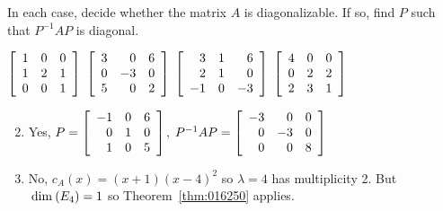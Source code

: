 \begin{multicols}{2}
\begin{ex}
\begin{sol}
\begin{enumerate}[label={\alph*.}]
\end{enumerate}
\end{sol}
\end{ex}

\begin{ex}
In each case, decide whether the matrix $A$ is diagonalizable. If so, find $P$ such that $P^{-1}AP$ is diagonal.

\begin{exenumerate}
\exitem $\left[ \begin{array}{rrr}
1 & 0 & 0 \\
1 & 2 & 1 \\
0 & 0 & 1
\end{array} \right]$
\exitem $\left[ \begin{array}{rrr}
3 &  0 & 6 \\
0 & -3 & 0 \\
5 &  0 & 2
\end{array} \right]$
\exitem $\left[ \begin{array}{rrr}
 3 &  1 &  6 \\
 2 &  1 &  0 \\
-1 &  0 & -3 
\end{array} \right]$
\exitem $\left[ \begin{array}{rrr}
4 & 0 & 0 \\
0 & 2 & 2 \\
2 & 3 & 1
\end{array} \right]$
\end{exenumerate}
\begin{sol}
\begin{enumerate}[label={\alph*.}]
\setcounter{enumi}{1}
\item  Yes, $ P =
\left[ \begin{array}{rrr}
-1 & 0 & 6 \\
 0 & 1 & 0 \\
 1 & 0 & 5
\end{array} \right]$, $P^{-1}AP = 
\left[ \begin{array}{rrr}
-3 &  0 & 0 \\
 0 & -3 & 0 \\
 0 &  0 & 8
\end{array} \right]$

\setcounter{enumi}{3}
\item  No, $c_{A}(x) = (x + 1)(x - 4)^{2}$ so $\lambda = 4$ has multiplicity 2. But $\thinspace\operatorname{dim\medspace}(E_{4}) = 1$ so Theorem~\ref{thm:016250} applies.

\end{enumerate}
\end{sol}
\end{ex}


\end{multicols}
